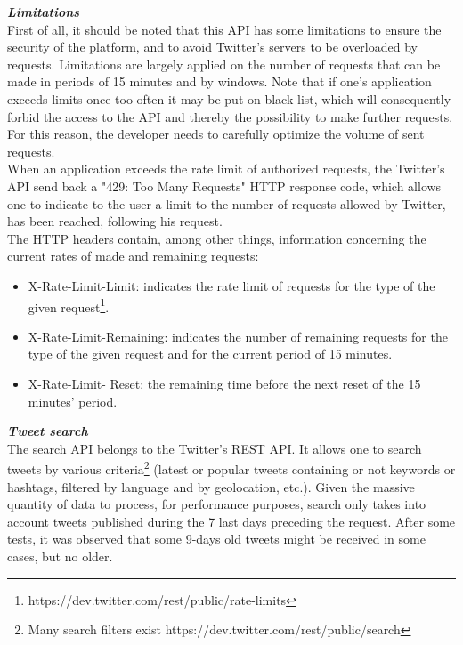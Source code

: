 \documentclass[a4paper,11pt]{report}
\begin{document}
\textbf{\emph{Limitations}}\\
First of all, it should be noted that this API has some limitations to ensure the security of the platform, and to avoid Twitter's servers to be overloaded by requests. Limitations are largely applied on the number of requests that can be made in periods of 15 minutes and by windows. Note that if one's application exceeds limits once too often it may be put on black list, which will consequently forbid the access to the API and thereby the possibility to make further requests. For this reason, the developer needs to carefully optimize the volume of sent requests.\\

When an application exceeds the rate limit of authorized requests, the Twitter's API send back a "429: Too Many Requests" HTTP response code, which allows one to indicate to the user a limit to the number of requests allowed by Twitter, has been reached, following his request.\\

The HTTP headers contain, among other things, information concerning the current rates of made and remaining requests:
\begin{itemize}
	\item X-Rate-Limit-Limit: indicates the rate limit of requests for the type of the given request\footnote{https://dev.twitter.com/rest/public/rate-limits}.
	\item X-Rate-Limit-Remaining: indicates the number of remaining requests for the type of the given request and for the current period of 15 minutes.
	\item X-Rate-Limit-	Reset: the remaining time before the next reset of the 15 minutes' period.
\end{itemize}
\newpage

\textbf{\emph{Tweet search}}\\
The search API belongs to the Twitter's REST API. It allows one to search tweets by various criteria\footnote{Many search filters exist https://dev.twitter.com/rest/public/search} (latest or popular tweets containing or not keywords or hashtags, filtered by language and by geolocation, etc.). Given the massive quantity of data to process, for performance purposes, search only takes into account tweets published during the 7 last days preceding the request. After some tests, it was observed that some 9-days old tweets might be received in some cases, but no older.\\
\end{document}
